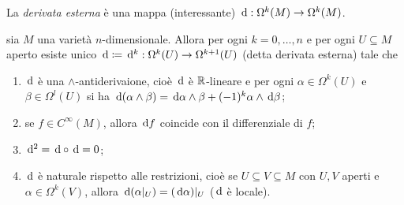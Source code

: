 La \emph{derivata esterna} è una mappa (interessante) $\,\mathrm d:\Omega^k(M) \to \Omega^k(M)$. %

\begin{theorem}
	sia $M$ una varietà $n$-dimensionale. Allora per ogni $k=0,\ldots,n$ e per ogni $U\subseteq M$ aperto esiste unico $\,\mathrm d \coloneqq \,\mathrm d^k : \Omega^k(U) \to \Omega^{k+1}(U)$ (detta derivata esterna) tale che
	\begin{enumerate}
		\item $\,\mathrm d$ è una $\wedge$-antiderivaione, cioè $\,\mathrm d$ è $\mathbb R$-lineare e per ogni $\alpha\in\Omega^k(U)$ e $\beta\in\Omega^l(U)$ si ha $\,\mathrm d(\alpha\wedge\beta) = \,\mathrm d\alpha \wedge \beta +(-1)^k \alpha\wedge \,\mathrm d \beta$;
		\item se $f\in C^\infty(M)$, allora $\,\mathrm d f$ coincide con il differenziale di $f$;
		\item $\,\mathrm d^2 = \,\mathrm d\circ \,\mathrm d = 0$;
		\item $\,\mathrm d$ è naturale rispetto alle restrizioni, cioè se $U\subseteq V \subseteq M$ con $U,V$ aperti e $\alpha\in\Omega^k(V)$, allora $\,\mathrm d(\alpha|_ U) = (\,\mathrm d\alpha)|_ U$ ($\,\mathrm d$ è locale).
	\end{enumerate}
\end{theorem}

